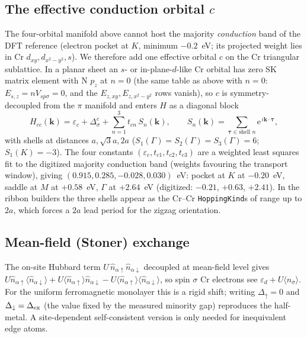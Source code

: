 \documentclass[11pt]{article}
\newcommand{\ee}{\mathrm{e}}
\begin{document}
\subsection{The effective conduction orbital $c$}
The four-orbital manifold above cannot host the majority \emph{conduction} band of the DFT
reference (electron pocket at $K$, minimum $-0.2$~eV; its projected weight lies in Cr
$d_{xy},d_{x^2-y^2},s$). We therefore add one effective orbital $c$ on the Cr triangular
sublattice. In a planar sheet an $s$- or in-plane-$d$-like Cr orbital has zero SK matrix element
with N $p_z$ at $n=0$ (the same table as above with $n=0$: $E_{s,z}=nV_{sp\sigma}=0$, and the
$E_{z,xy}, E_{z,x^2-y^2}$ rows vanish), so $c$ is symmetry-decoupled from the $\pi$ manifold and
enters $H$ as a diagonal block
\begin{equation}
H_{cc}(\mathbf k)=\varepsilon_c+\Delta^c_\sigma+\sum_{n=1}^{3}t_{cn}\,S_n(\mathbf k),\qquad
S_n(\mathbf k)=\sum_{\boldsymbol\tau\in\text{shell }n}\ee^{\,i\mathbf k\cdot\boldsymbol\tau},
\end{equation}
with shells at distances $a,\sqrt3 a,2a$ ($S_1(\Gamma){=}S_2(\Gamma){=}S_3(\Gamma){=}6$;
$S_1(K){=}-3$). The four constants $(\varepsilon_c,t_{c1},t_{c2},t_{c3})$ are a weighted least
squares fit to the digitized majority conduction band (weights favouring the transport window),
giving $(0.915,0.285,-0.028,0.030)$~eV: pocket at $K$ at $-0.20$~eV, saddle at $M$ at
$+0.58$~eV, $\Gamma$ at $+2.64$~eV (digitized: $-0.21$, $+0.63$, $+2.41$). In the ribbon
builders the three shells appear as the Cr--Cr \texttt{HoppingKind}s of range up to $2a$, which
forces a $2a$ lead period for the zigzag orientation.

\subsection{Mean-field (Stoner) exchange}
The on-site Hubbard term $U\,\hat n_{\alpha\uparrow}\hat n_{\alpha\downarrow}$ decoupled at
mean-field level gives $U\hat n_{\alpha\uparrow}\langle\hat n_{\alpha\downarrow}\rangle
+U\langle\hat n_{\alpha\uparrow}\rangle\hat n_{\alpha\downarrow}-U\langle\hat n_{\alpha\uparrow}
\rangle\langle\hat n_{\alpha\downarrow}\rangle$, so spin $\sigma$ Cr electrons see
$\varepsilon_{d}+U\langle n_{\bar\sigma}\rangle$. For the uniform ferromagnetic monolayer this is a
rigid shift; writing $\Delta_\uparrow=0$ and $\Delta_\downarrow=\Delta_{\rm ex}$ (the value fixed
by the measured minority gap) reproduces the half-metal. A site-dependent self-consistent version
is only needed for inequivalent edge atoms.
\end{document}
